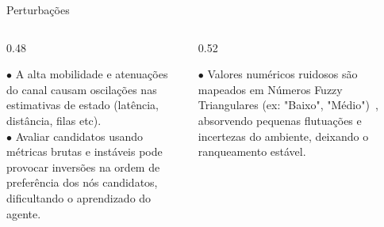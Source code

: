 \documentclass{beamer}
\begin{document}
\begin{frame}{Perturbações}
    \begin{columns}[T]
        \begin{column}{0.48\textwidth}
            \vspace*{0.2cm}
            \begin{tcolorbox}[colback=purple!5, colframe=purple!80!black, title=Problema, fonttitle=\bfseries\footnotesize, arc=0pt, outer arc=0pt, leftrule=3pt, rightrule=0.3pt, toprule=0.1pt, bottomrule=0.3pt]
                \scriptsize
                $\bullet$ A alta mobilidade e atenuações do canal causam oscilações nas estimativas de estado (latência, distância, filas etc).\\
                
                \vspace{0.15cm}
                $\bullet$ Avaliar candidatos usando métricas brutas e instáveis pode provocar inversões na ordem de preferência dos nós candidatos, dificultando o aprendizado do agente.
            \end{tcolorbox}
        \end{column}
        
        \begin{column}{0.52\textwidth}
            \centering
            \vspace{0.2cm}
            \begin{tcolorbox}[colback=cyan!5, colframe=cyan!80!black, title=Solução: Atenuação de Ruído, fonttitle=\bfseries\footnotesize, arc=0pt, outer arc=0pt, leftrule=3pt, rightrule=0.3pt, toprule=0.1pt, bottomrule=0.3pt]
                \scriptsize
                $\bullet$ Valores numéricos ruidosos são mapeados em Números Fuzzy Triangulares (ex: "Baixo", "Médio")~\cite{vieira2025foff}, absorvendo pequenas flutuações e incertezas do ambiente, deixando o ranqueamento estável.\\
            \end{tcolorbox}
        \end{column}
    \end{columns}
    
    \vspace{0.3cm}
    \begin{center}
\end{center}
\end{frame}
\end{document}
